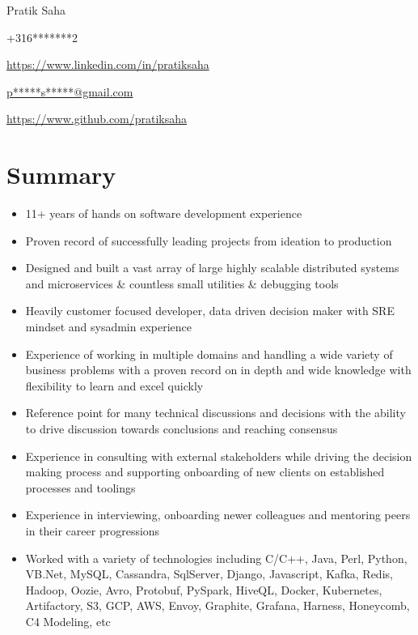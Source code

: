 \documentclass{article}
\begin{document}
\begin{center}\selectfont\Large Pratik Saha\end{center}

{\raggedright \Mobilefone \space +316*******2} \hfill { \raggedleft \faLinkedin \space \href{https://www.linkedin.com/in/pratiksaha}{https://www.linkedin.com/in/pratiksaha} }

{\raggedright {} \space \href{mailto:p*****s*****@gmail.com}{p*****s*****@gmail.com}} \hfill { \raggedleft \faGithub \space  \href{https://www.github.com/pratiksaha}{https://www.github.com/pratiksaha} }

\section{Summary}
\begin{itemize}[noitemsep,nolistsep]
\item 11+ years of hands on software development experience
\item Proven record of successfully leading projects from ideation to production
\item Designed and built a vast array of large highly scalable distributed systems and microservices \& countless small utilities \& debugging tools
\item Heavily customer focused developer, data driven decision maker with SRE mindset and sysadmin experience
\item Experience of working in multiple domains and handling a wide variety of business problems with a proven record on in depth and wide knowledge with flexibility to learn and excel quickly
\item Reference point for many technical discussions and decisions with the ability to drive discussion towards conclusions and reaching consensus
\item Experience in consulting with external stakeholders while driving the decision making process and supporting onboarding of new clients on established processes and toolings
\item Experience in interviewing, onboarding newer colleagues and mentoring peers in their career progressions
\item Worked with a variety of technologies including C/C++, Java, Perl, Python, VB.Net, MySQL, Cassandra, SqlServer, Django, Javascript, Kafka, Redis, Hadoop, Oozie, Avro, Protobuf, PySpark, HiveQL, Docker, Kubernetes, Artifactory, S3, GCP, AWS, Envoy, Graphite, Grafana, Harness, Honeycomb, C4 Modeling, etc
\end{itemize}
\end{document}

